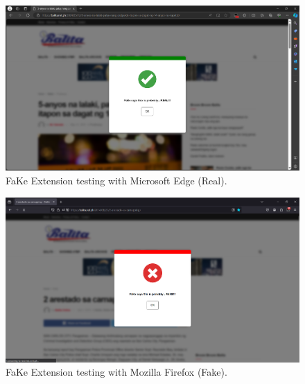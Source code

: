         \begin{figure}[h!]
            \centering
            \includegraphics[width=1\textwidth,height=1\textheight, keepaspectratio]{figures/Screenshots/edge-true-negative.png}
            \caption{FaKe Extension testing with Microsoft Edge (Real).}
            \label{fig:real-edge-test}
        \end{figure}

        \begin{figure}[h!]
            \centering
            \includegraphics[width=1\textwidth,height=1\textheight, keepaspectratio]{figures/Screenshots/firefox-true-positive.png}
            \caption{FaKe Extension testing with Mozilla Firefox (Fake).}
            \label{fig:fake-firefox-test}
        \end{figure}

